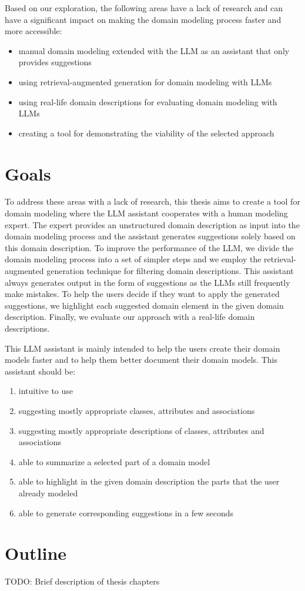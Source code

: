 Based on our exploration, the following areas have a lack of research and can have a significant impact on making the domain modeling process faster and more accessible:

\begin{itemize}
\item manual domain modeling extended with the LLM as an assistant that only provides suggestions
\item using retrieval-augmented generation for domain modeling with LLMs
\item using real-life domain descriptions for evaluating domain modeling with LLMs
\item creating a tool for demonstrating the viability of the selected approach
\end{itemize}


\section*{Goals}

To address these areas with a lack of research, this thesis aims to create a tool for domain modeling where the LLM assistant cooperates with a human modeling expert. The expert provides an unstructured domain description as input into the domain modeling process and the assistant generates suggestions solely based on this domain description. To improve the performance of the LLM, we divide the domain modeling process into a set of simpler steps and we employ the retrieval-augmented generation technique for filtering domain descriptions. This assistant always generates output in the form of suggestions as the LLMs still frequently make mistakes. To help the users decide if they want to apply the generated suggestions, we highlight each suggested domain element in the given domain description. Finally, we evaluate our approach with a real-life domain descriptions.

This LLM assistant is mainly intended to help the users create their domain models faster and to help them better document their domain models. This assistant should be:

\begin{enumerate}
\item intuitive to use
\item suggesting mostly appropriate classes, attributes and associations
\item suggesting mostly appropriate descriptions of classes, attributes and associations
\item able to summarize a selected part of a domain model
\item able to highlight in the given domain description the parts that the user already modeled
\item able to generate corresponding suggestions in a few seconds
\end{enumerate}


\section*{Outline}

TODO: Brief description of thesis chapters